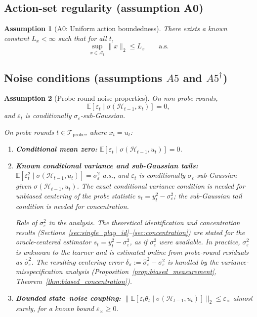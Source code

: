 \documentclass[12pt]{article}
\newcommand{\E}{\mathbb{E}}
\newcommand{\cA}{\mathcal{A}}
\newcommand{\cH}{\mathcal{H}}
\newcommand{\cTprobe}{\mathcal{T}_{\mathrm{probe}}}
\newtheorem{assumption}{Assumption}
\theoremstyle{plain}
\theoremstyle{definition}
\begin{document}
\subsection{Action-set regularity (assumption A0)}

\begin{assumption}[A0: Uniform action boundedness]
\label{assum:action_boundedness}
There exists a known constant $L_x < \infty$ such that for all $t$,
\[
\sup_{x \in \cA_t} \|x\|_2 \le L_x \qquad \text{a.s.}
\]
\end{assumption}



\subsection{\texorpdfstring{Noise conditions (assumptions $A5$ and $A5^\dagger$)}{Noise conditions (assumptions A5 and A5 dagger)}}

\begin{assumption}[Probe-round noise properties]
\label{assum:probe_noise}
On non-probe rounds,
\[
\E[\varepsilon_t \mid \sigma(\cH_{t-1}, x_t)] = 0,
\]
and $\varepsilon_t$ is conditionally $\sigma_\varepsilon$-sub-Gaussian.

On probe rounds $t \in \cTprobe$, where $x_t = u_t$:


\begin{enumerate}[label=(\roman*)]
\item \textbf{Conditional mean zero:}
$\E[\varepsilon_t \mid \sigma(\cH_{t-1}, u_t)] = 0$.
\item \textbf{Known conditional variance and sub-Gaussian tails:}
$\E[\varepsilon_t^2 \mid \sigma(\cH_{t-1}, u_t)] = \sigma_\varepsilon^2$ a.s., and $\varepsilon_t$ is conditionally $\sigma_\varepsilon$-sub-Gaussian given $\sigma(\cH_{t-1}, u_t)$. The exact conditional variance condition is needed for unbiased centering of the probe statistic $s_t = y_t^2 - \sigma_\varepsilon^2$; the sub-Gaussian tail condition is needed for concentration.

\emph{Role of $\sigma_\varepsilon^2$ in the analysis.} The theoretical identification and concentration results (Sections~\ref{sec:single_play_id}--\ref{sec:concentration}) are stated for the oracle-centered estimator $s_t = y_t^2 - \sigma_\varepsilon^2$, as if $\sigma_\varepsilon^2$ were available. In practice, $\sigma_\varepsilon^2$ is \emph{unknown} to the learner and is estimated online from probe-round residuals as $\hat\sigma_\varepsilon^2$. The resulting centering error $\delta_\sigma := \hat\sigma_\varepsilon^2 - \sigma_\varepsilon^2$ is handled by the variance-misspecification analysis (Proposition~\ref{prop:biased_measurement}, Theorem~\ref{thm:biased_concentration}).
\item \textbf{Bounded state--noise coupling:}
$\bigl\|\E[\varepsilon_t \theta_t \mid \sigma(\cH_{t-1}, u_t)]\bigr\|_2 \le \varepsilon_\times$ almost surely, for a known bound $\varepsilon_\times \ge 0$.
\end{enumerate}
\end{assumption}
\end{document}
